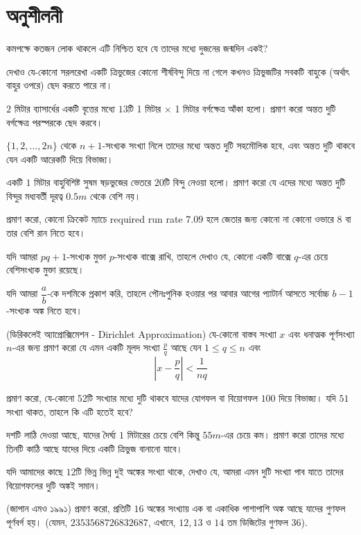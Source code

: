 \section{অনুশীলনী}
\begin{exercise}
	\item কমপক্ষে কতজন লোক থাকলে এটি নিশ্চিত হবে যে তাদের মধ্যে দুজনের জন্মদিন একই?
	\item দেখাও যে-কোনো সরলরেখা একটি ত্রিভুজের কোনো শীর্ষবিন্দু দিয়ে না গেলে কখনও ত্রিভুজটির সবকটি বাহুকে (অর্থাৎ বাহুর ওপরে) ছেদ করতে পারে না।
	\item $2$ মিটার ব্যাসার্ধের একটি বৃত্তের মধ্যে $13$টি 1 মিটার $\times$ 1 মিটার বর্গক্ষেত্র আঁকা হলো। প্রমাণ করো অন্তত দুটি বর্গক্ষেত্র পরস্পরকে ছেদ করবে।
	\item $\{1,2,\dots,2n\}$ থেকে $n+1$-সংখ্যক সংখ্যা নিলে তাদের মধ্যে অন্তত দুটি সহমৌলিক হবে, এবং অন্তত দুটি থাকবে যেন একটি আরেকটি দিয়ে বিভাজ্য। 
	\item একটি $1$ মিটার বাহুবিশিষ্ট সুষম ষড়ভুজের ভেতরে $20$টি বিন্দু নেওয়া হলো। প্রমাণ করো যে এদের মধ্যে অন্তত দুটি বিন্দুর মধ্যবর্তী দূরত্ব $0.5m$ থেকে বেশি নয়।
	\item প্রমাণ করো, কোনো ক্রিকেট ম্যাচে required run rate $7.09$ হলে জেতার জন্য কোনো না কোনো ওভারে $8$ বা তার বেশি রান নিতে হবে।
	\item যদি আমরা $pq+1$-সংখ্যক মুক্তা $p$-সংখ্যক বাক্সে রাখি, তাহলে দেখাও যে, কোনো একটি বাক্সে $q$-এর চেয়ে বেশিসংখ্যক মুক্তা রয়েছে।
	\item যদি আমরা $\dfrac{a}{b}$-কে দশমিকে প্রকাশ করি, তাহলে পৌনঃপুনিক হওয়ার পর আবার আগের প্যাটার্ন আসতে সর্বোচ্চ $b-1$-সংখ্যক অঙ্ক নিতে হবে।
	\item (ডিরিকলেই অ্যাপ্রোক্সিমেশন - Dirichlet Approximation) যে-কোনো বাস্তব সংখ্যা $x$ এবং ধনাত্মক পূর্ণসংখ্যা $n$-এর জন্য প্রমাণ করো যে এমন একটি মূলদ সংখ্যা $\frac p q$ আছে যেন $1\leq q\leq n$ এবং
	\[\left|x-\frac p q\right| < \frac 1 {nq}\]
	\item প্রমাণ করো, যে-কোনো $52$টি সংখ্যার মধ্যে দুটি থাকবে যাদের যোগফল বা বিয়োগফল $100$ দিয়ে বিভাজ্য। যদি $51$ সংখ্যা থাকত, তাহলে কি এটি হতেই হবে? 
	\item দশটি লাঠি দেওয়া আছে, যাদের দৈর্ঘ্য $1$ মিটারের চেয়ে বেশি কিন্তু $55m$-এর চেয়ে কম। প্রমাণ করো তাদের মধ্যে তিনটি কাঠি আছে যাদের দিয়ে একটি ত্রিভুজ বানানো যাবে। 
	\item যদি আমাদের কাছে $12$টি ভিন্ন ভিন্ন দুই অঙ্কের সংখ্যা থাকে, দেখাও যে, আমরা এমন দুটি সংখ্যা পাব যাতে তাদের বিয়োগফলের দুটি অঙ্কই সমান।
	\item (জাপান এমও ১৯৯১) প্রমাণ করো, প্রতিটি $16$ অঙ্কের সংখ্যায় এক বা একাধিক পাশাপাশি অঙ্ক আছে যাদের গুণফল পূর্ণবর্গ হয়। (যেমন, $2353568726832687$, এখানে, $12, 13$ ও $14$ তম ডিজিটের গুণফল $36$).

\end{exercise}
